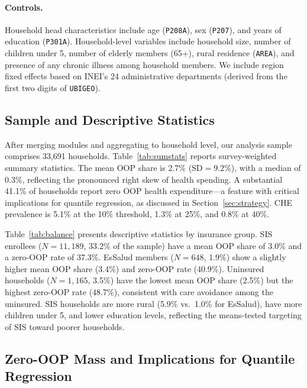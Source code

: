 \paragraph{Controls.} Household head characteristics include age (\texttt{P208A}), sex (\texttt{P207}), and years of education (\texttt{P301A}). Household-level variables include household size, number of children under 5, number of elderly members (65+), rural residence (\texttt{AREA}), and presence of any chronic illness among household members. We include region fixed effects based on INEI's 24 administrative departments (derived from the first two digits of \texttt{UBIGEO}).

\subsection{Sample and Descriptive Statistics}

After merging modules and aggregating to household level, our analysis sample comprises 33,691 households. Table~\ref{tab:sumstats} reports survey-weighted summary statistics. The mean OOP share is 2.7\% ($\text{SD} = 9.2\%$), with a median of 0.3\%, reflecting the pronounced right skew of health spending. A substantial 41.1\% of households report zero OOP health expenditure---a feature with critical implications for quantile regression, as discussed in Section~\ref{sec:strategy}. CHE prevalence is 5.1\% at the 10\% threshold, 1.3\% at 25\%, and 0.8\% at 40\%.



Table~\ref{tab:balance} presents descriptive statistics by insurance group. SIS enrollees ($N = 11{,}189$, 33.2\% of the sample) have a mean OOP share of 3.0\% and a zero-OOP rate of 37.3\%. EsSalud members ($N = 648$, 1.9\%) show a slightly higher mean OOP share (3.4\%) and zero-OOP rate (40.9\%). Uninsured households ($N = 1{,}165$, 3.5\%) have the lowest mean OOP share (2.5\%) but the highest zero-OOP rate (48.7\%), consistent with care avoidance among the uninsured. SIS households are more rural (5.9\% vs.\ 1.0\% for EsSalud), have more children under 5, and lower education levels, reflecting the means-tested targeting of SIS toward poorer households.



\subsection{Zero-OOP Mass and Implications for Quantile Regression}

